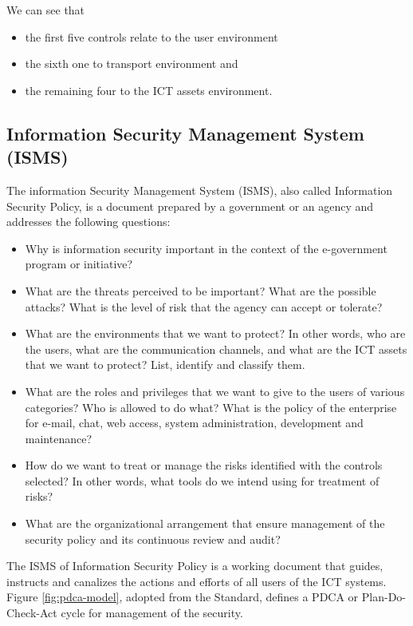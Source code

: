 We can see that
\begin{itemize}
	\item the first five controls relate to the user environment
	\item the sixth one to transport environment and
	\item the remaining four to the ICT assets environment.
\end{itemize}
 
\subsection[ISMS]{Information Security Management System (ISMS)}
The information Security Management System (ISMS), also called Information Security Policy, is a document prepared by a government or an agency and addresses the following questions:

\begin{itemize}
 \item Why is information security important in the context of the e-government program or initiative?
 
 \item What are the threats perceived to be important? What are the possible attacks? What is the level of risk that the agency can accept or tolerate?
 
 \item What are the environments that we want to protect? In other words, who are the users, what are the communication channels, and what are the ICT assets that we want to protect? List, identify and classify them.
 
 \item What are the roles and privileges that we want to give to the users of various categories? Who is allowed to do what? What is the policy of the enterprise for e-mail, chat, web access, system administration, development and maintenance?
 
 \item How do we want to treat or manage the risks identified with the controls selected? In other words, what tools do we intend using for treatment of risks?
 
 \item What are the organizational arrangement that ensure management of the security policy and its continuous review and audit?
\end{itemize}

The ISMS of Information Security Policy is a working document that guides, instructs and canalizes the actions and efforts of all users of the ICT systems. Figure {\ref{fig:pdca-model}}, adopted from the Standard, defines a PDCA or Plan-Do-Check-Act cycle for management of the security.

